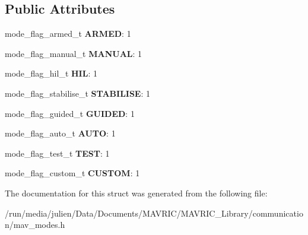 \subsection*{Public Attributes}
\begin{DoxyCompactItemize}
\item 
\hypertarget{structmav__mode__bitfield__t_a2fe3da5c127ab4dd72c0a1f81d890e7b}{mode\+\_\+flag\+\_\+armed\+\_\+t {\bfseries A\+R\+M\+E\+D}\+: 1}\label{structmav__mode__bitfield__t_a2fe3da5c127ab4dd72c0a1f81d890e7b}

\item 
\hypertarget{structmav__mode__bitfield__t_ac8d1bcde30da40a75dca22f037b4e4ad}{mode\+\_\+flag\+\_\+manual\+\_\+t {\bfseries M\+A\+N\+U\+A\+L}\+: 1}\label{structmav__mode__bitfield__t_ac8d1bcde30da40a75dca22f037b4e4ad}

\item 
\hypertarget{structmav__mode__bitfield__t_aec33764b3e0af4f7fc0e171a766aa3b4}{mode\+\_\+flag\+\_\+hil\+\_\+t {\bfseries H\+I\+L}\+: 1}\label{structmav__mode__bitfield__t_aec33764b3e0af4f7fc0e171a766aa3b4}

\item 
\hypertarget{structmav__mode__bitfield__t_a31ed6223445640c122944cbaba9d2e38}{mode\+\_\+flag\+\_\+stabilise\+\_\+t {\bfseries S\+T\+A\+B\+I\+L\+I\+S\+E}\+: 1}\label{structmav__mode__bitfield__t_a31ed6223445640c122944cbaba9d2e38}

\item 
\hypertarget{structmav__mode__bitfield__t_a6bfc9fe5afee91cd0de362431e63423e}{mode\+\_\+flag\+\_\+guided\+\_\+t {\bfseries G\+U\+I\+D\+E\+D}\+: 1}\label{structmav__mode__bitfield__t_a6bfc9fe5afee91cd0de362431e63423e}

\item 
\hypertarget{structmav__mode__bitfield__t_a988d0f21f219a269c82a164343050560}{mode\+\_\+flag\+\_\+auto\+\_\+t {\bfseries A\+U\+T\+O}\+: 1}\label{structmav__mode__bitfield__t_a988d0f21f219a269c82a164343050560}

\item 
\hypertarget{structmav__mode__bitfield__t_acc0aa99e06391b1d7ac00a472c207151}{mode\+\_\+flag\+\_\+test\+\_\+t {\bfseries T\+E\+S\+T}\+: 1}\label{structmav__mode__bitfield__t_acc0aa99e06391b1d7ac00a472c207151}

\item 
\hypertarget{structmav__mode__bitfield__t_a0a20ac7e90d1e7350bac0ee8386a5dd8}{mode\+\_\+flag\+\_\+custom\+\_\+t {\bfseries C\+U\+S\+T\+O\+M}\+: 1}\label{structmav__mode__bitfield__t_a0a20ac7e90d1e7350bac0ee8386a5dd8}

\end{DoxyCompactItemize}


The documentation for this struct was generated from the following file\+:\begin{DoxyCompactItemize}
\item 
/run/media/julien/\+Data/\+Documents/\+M\+A\+V\+R\+I\+C/\+M\+A\+V\+R\+I\+C\+\_\+\+Library/communication/mav\+\_\+modes.\+h\end{DoxyCompactItemize}
